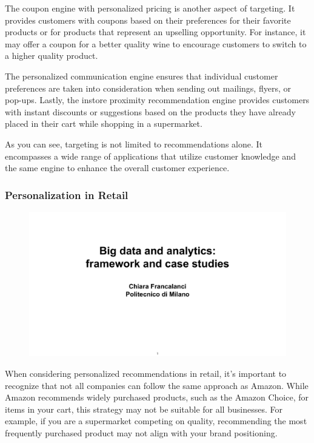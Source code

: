 The coupon engine with personalized pricing is another aspect of
targeting. It provides customers with coupons based on their preferences
for their favorite products or for products that represent an upselling
opportunity. For instance, it may offer a coupon for a better quality
wine to encourage customers to switch to a higher quality product.

The personalized communication engine ensures that individual customer
preferences are taken into consideration when sending out mailings,
flyers, or pop-ups. Lastly, the instore proximity recommendation engine
provides customers with instant discounts or suggestions based on the
products they have already placed in their cart while shopping in a
supermarket.

As you can see, targeting is not limited to recommendations alone. It
encompasses a wide range of applications that utilize customer knowledge
and the same engine to enhance the overall customer experience.

\subsubsection{Personalization in Retail}

\begin{figure}[!h]
    \centering
    \includegraphics[page=90, trim = 0cm 3cm 1.5cm 4.5cm, clip, width=\textwidth]{images/06 - BIG_DATA.pdf}
\end{figure}

When considering personalized recommendations in retail, it's important
to recognize that not all companies can follow the same approach as
Amazon. While Amazon recommends widely purchased products, such as the
Amazon Choice, for items in your cart, this strategy may not be suitable
for all businesses. For example, if you are a supermarket competing on
quality, recommending the most frequently purchased product may not
align with your brand positioning.


